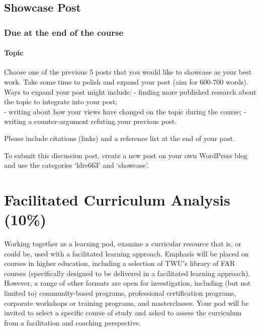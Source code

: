\documentclass[
]{book}
\begin{document}
\hypertarget{showcase-post}{%
\subsection*{Showcase Post}\label{showcase-post}}

\hypertarget{due-at-the-end-of-the-course}{%
\subsubsection*{Due at the end of the course}\label{due-at-the-end-of-the-course}}

\hypertarget{topic-3}{%
\paragraph*{Topic}\label{topic-3}}

Choose one of the previous 5 posts that you would like to showcase as your best work. Take some time to polish and expand your post (aim for 600-700 words). Ways to expand your post might include:
- finding more published research about the topic to integrate into your post;\\
- writing about how your views have changed on the topic during the course;
- writing a counter-argument refuting your previous post.

Please include citations (links) and a reference list at the end of your post.

To submit this discussion post, create a new post on your own WordPress blog and use the categories `ldrs663' and `showcase'.

\hypertarget{facilitated-curriculum-analysis-10}{%
\section*{Facilitated Curriculum Analysis (10\%)}\label{facilitated-curriculum-analysis-10}}

Working together as a learning pod, examine a curricular resource that is, or could be, used with a facilitated learning approach. Emphasis will be placed on courses in higher education, including a selection of TWU's library of FAR courses (specifically designed to be delivered in a facilitated learning approach). However, a range of other formats are open for investigation, including (but not limited to) community-based programs, professional certification programs, corporate workshops or training programs, and masterclasses. Your pod will be invited to select a specific course of study and asked to assess the curriculum from a facilitation and coaching perspective.
\end{document}

